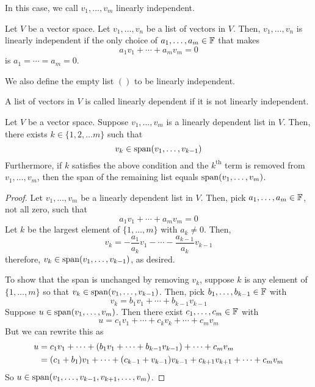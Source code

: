 In this case, we call $v_1, \dots, v_m$ linearly independent.
\begin{definition}
    Let $V$ be a vector space. Let $v_1, \dots, v_n$ be a list of vectors in $V$. Then, $v_1, \dots, v_n$ is linearly independent if the only choice of $a_1, \dots, a_m\in \mathbb F$ that makes
    \[ a_1v_1 + \cdots + a_mv_m = 0\]
    is $a_1 = \cdots = a_m = 0$.

    We also define the empty list $()$ to be linearly independent.
\end{definition}
\begin{definition}
    A list of vectors in $V$ is called linearly dependent if it is not linearly independent.
\end{definition}
\begin{theorem}
    Let $V$ be a vector space. Suppose $v_1, \dots, v_m$ is a linearly dependent list in $V$. Then, there exists $k\in\{1, 2, \dots m\}$ such that
    \[ v_k \in \operatorname{span}(v_1, \dots, v_{k-1})\]
    Furthermore, if $k$ satisfies the above condition and the $k^\text{th}$ term is removed from $v_1, \dots, v_m$, then the span of the remaining list equals $\operatorname{span}(v_1, \dots, v_m)$.
\end{theorem}
\begin{proof}
    Let $v_1, \dots, v_m$ be a linearly dependent list in $V$. Then, pick $a_1, \dots, a_m\in\mathbb F$, not all zero, such that
    \[ a_1v_1 + \cdots + a_mv_m = 0\]
    Let $k$ be the largest element of $\{1, \dots, m\}$ with $a_k \ne 0$. Then, 
    \[ v_k = -\frac{a_1}{a_k}v_1 - \cdots - \frac{a_{k-1}}{a_k}v_{k-1} \]
    therefore, $v_k\in\operatorname{span}(v_1, \dots, v_{k-1})$, as desired.

    To show that the span is unchanged by removing $v_k$, suppose $k$ is any element of $\{1, \dots, m\}$ so that $v_k \in \operatorname{span}(v_1, \dots, v_{k-1})$. Then, pick $b_1, \dots, b_{k-1}\in \mathbb F$ with
    \[ v_k = b_1v_1 + \cdots + b_{k-1}v_{k-1} \]
    Suppose $u\in \operatorname{span}(v_1, \dots, v_m)$. Then there exist $c_1, \dots, c_m\in \mathbb F$ with
    \[ u = c_1v_1 + \cdots + c_kv_k + \cdots + c_mv_m\]
    But we can rewrite this as
    \begin{align*}
        u &= c_1v_1 + \cdots + \pqty{b_1v_1 + \cdots + b_{k-1}v_{k-1}} + \cdots + c_mv_m \\
        &= (c_1+b_1)v_1 + \cdots + (c_{k-1}+v_{k-1})v_{k-1} + c_{k+1}v_{k+1} + \cdots + c_mv_m
    \end{align*}
    So $u\in\operatorname{span}(v_1, \dots, v_{k-1}, v_{k+1}, \dots, v_m)$.
\end{proof}
